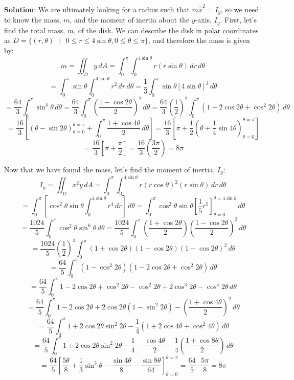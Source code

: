 \textbf{Solution}: We are ultimately looking for a radius such that $m
\overline{\overline{x}}^2 = I_y$, so we need to know the mass, $m$, and the 
moment of inertia about the $y$-axis, $I_y$. First, let's find the total mass, 
$m$, of the disk. We can describe the disk in polar coordinates as $\textit{D} 
= \{(r, \theta)\text{ }|\text{ }0 \leq r \leq 4\sin{\theta}, 0 \leq \theta 
\leq \pi\}$, and therefore the mass is given by:
$$m = \iint_{\textit{D}} y \,dA = \int_0^{\pi} \int_0^{4\sin{\theta}} r \left(r
\sin{\theta} \right)\,dr \,d\theta$$
$$= \int_0^{\pi} \sin{\theta} \int_0^{4\sin{\theta}} r^2\,dr\,d\theta = \frac{1
}{3} \int_0^{\pi} \sin{\theta} \left[ 4\sin{\theta} \right]^3\,d\theta$$
$$= \frac{64}{3} \int_0^{\pi} \sin^4{\theta}\,d\theta = \frac{64}{3} \int_0^{
\pi} \left( \frac{1 - \cos{2\theta}}{2} \right)^2\,d\theta = \frac{64}{3} 
\left( \frac{1}{2} \right)^2 \int_0^{\pi} \left( 1 - 2\cos{2\theta} + \cos^2{2
\theta}\right) \,d\theta$$
$$= \frac{16}{3} \left[ \left(\theta - \sin{2\theta} \right)_{\theta = 0}^{
\theta = \pi} + \int_0^{\pi} \frac{1 + \cos{4\theta}}{2} \,d\theta \right] = 
\frac{16}{3} \left[ \pi + \frac{1}{2} \left(\theta + \frac{1}{4}\sin{4\theta} 
\right)_{\theta = 0}^{\theta = \pi} \right]$$
$$= \frac{16}{3} \left[ \pi + \frac{\pi}{2} \right] = \frac{16}{3} \left( 
\frac{3\pi}{2} \right) = 8\pi$$

Now that we have found the mass, let's find the moment of inertia, $I_y$:
$$I_y = \iint_{\textit{D}} x^2 y\,dA = \int_0^{\pi} \int_0^{4\sin{\theta}} r 
\left(r \cos{\theta} \right)^2 \left(r \sin{\theta} \right)\,dr\,d\theta$$
$$= \int_0^{\pi} \left[ \cos^2{\theta} \sin{\theta} \int_0^{4\sin{\theta}} r^4 
\,dr \right]\,d\theta = \int_0^{\pi} \cos^2{\theta} \sin{\theta} \left[\frac{1
}{5}r^5 \right]_{\theta = 0}^{\theta = 4\sin{\theta}}\,d\theta$$
$$= \frac{1024}{5} \int_0^{\pi} \cos^2{\theta} \sin^6{\theta}\,d\theta = \frac{
1024}{5} \int_0^{\pi} \left( \frac{1 + \cos{2\theta}}{2} \right) \left( \frac{1
 - \cos{2\theta}}{2} \right)^3\,d\theta$$
$$= \frac{1024}{5} \left(\frac{1}{2} \right)^4 \int_0^{\pi} \left(1 + \cos{2
\theta} \right) \left( 1 - \cos{2\theta} \right) \left(1 - \cos{2\theta} 
\right)^2\,d\theta$$
$$= \frac{64}{5} \int_0^{\pi} \left(1 - \cos^2{2\theta} \right) \left(1 - 2
\cos{2\theta} + \cos^2{2\theta} \right)\,d\theta$$
$$= \frac{64}{5} \int_0^{\pi} 1 - 2\cos{2\theta} + \cos^2{2\theta} - \cos^2{2
\theta} + 2\cos^3{2\theta} - \cos^4{2\theta} \,d\theta$$
$$= \frac{64}{5} \int_0^{\pi} 1 - 2\cos{2\theta} + 2\cos{2\theta} \left(1 - 
\sin^2{2\theta} \right) - \left( \frac{1 + \cos{4\theta}}{2} \right)^2\,d
\theta$$
$$= \frac{64}{5} \int_0^{\pi} 1 + 2\cos{2\theta}\sin^2{2\theta} - \frac{1}{4} 
\left(1 + 2\cos{4\theta} + \cos^2{4\theta} \right)\,d\theta$$
$$= \frac{64}{5} \int_0^{\pi} 1 + 2\cos{2\theta}\sin^2{2\theta} - \frac{1}{4} 
- \frac{\cos{4\theta}}{2} - \frac{1}{4}\left( \frac{1 + \cos{8\theta}}{2} 
\right)\,d\theta$$
$$= \frac{64}{5} \left[\frac{5\theta}{8} + \frac{1}{3}\sin^3{\theta} - \frac{
\sin{4\theta}}{8} - \frac{\sin{8\theta}}{64} \right]_{\theta = 0}^{\theta = \pi
} = \frac{64}{5} \cdot \frac{5\pi}{8} = 8\pi$$

